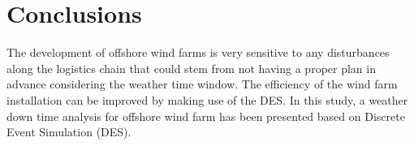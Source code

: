 \section{Conclusions}
The development of offshore wind farms is very sensitive to any disturbances along the logistics chain that could stem from not having a proper plan in advance considering the weather time window. The efficiency of the wind farm installation can be improved by making use of the DES.
In this study, a weather down time analysis for offshore wind farm has been presented based on Discrete Event Simulation (DES). 
